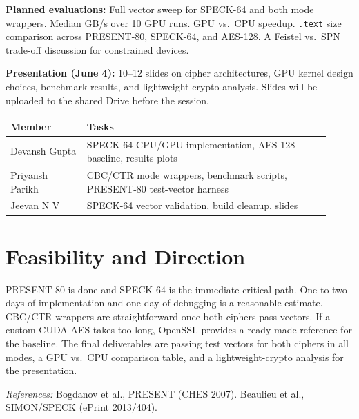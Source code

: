 \documentclass[10pt]{article}
\begin{document}
\textbf{Planned evaluations:} Full vector sweep for SPECK-64 and both mode wrappers.
Median GB/s over 10 GPU runs. GPU vs.\ CPU speedup. \texttt{.text} size comparison
across PRESENT-80, SPECK-64, and AES-128. A Feistel vs.\ SPN trade-off discussion
for constrained devices.

\textbf{Presentation (June 4):} 10--12 slides on cipher architectures, GPU kernel
design choices, benchmark results, and lightweight-crypto analysis. Slides will be
uploaded to the shared Drive before the session.

\begin{table}[h]
\centering
\small
\begin{tabular}{p{0.22\linewidth}p{0.7\linewidth}}
\toprule
\textbf{Member} & \textbf{Tasks} \\
\midrule
Devansh Gupta    & SPECK-64 CPU/GPU implementation, AES-128 baseline, results plots \\
Priyansh Parikh  & CBC/CTR mode wrappers, benchmark scripts, PRESENT-80 test-vector harness \\
Jeevan N V       & SPECK-64 vector validation, build cleanup, slides \\
\bottomrule
\end{tabular}
\end{table}

\section*{Feasibility and Direction}
PRESENT-80 is done and SPECK-64 is the immediate critical path. One to two days of
implementation and one day of debugging is a reasonable estimate. CBC/CTR wrappers are
straightforward once both ciphers pass vectors. If a custom CUDA AES takes too long,
OpenSSL provides a ready-made reference for the baseline. The final deliverables are
passing test vectors for both ciphers in all modes, a GPU vs.\ CPU comparison table,
and a lightweight-crypto analysis for the presentation.

\vspace{0.3em}
\small\textit{References:} Bogdanov et al., PRESENT (CHES 2007). Beaulieu et al.,
SIMON/SPECK (ePrint 2013/404).
\end{document}
